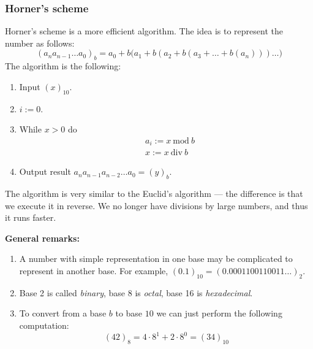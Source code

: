 \subsubsection{Horner's scheme}
Horner's scheme is a more efficient algorithm. The idea is to represent
the number as follows:
\[
    (a_n a_{n - 1} \dots a_{0})_b = 
    a_0 + b\bigl(a_1 + b(a_2 + b(a_3 + \dots + b (a_n))) \dots \bigr)
\]
The algorithm is the following:
\begin{enumerate}
    \item {
        Input $(x)_{10}$.
    }
    \item {
        $i := 0$.
    }
    \item {
        While $x > 0$ do
        \begin{align*}
            &
            a_i := x \ \mathrm{mod}\ b
            \\&
            x := x \ \mathrm{div}\ b
        \end{align*}
    }
    \item {
        Output result $a_n a_{n-1} a_{n-2} \dots a_0 = (y)_b$.
    }
\end{enumerate}
\begin{remark}
    The algorithm is very similar to the Euclid's algorithm ---
    the difference is that we execute it in reverse. 
    We no longer have divisions by large numbers, and thus
    it runs faster.
\end{remark}

\textbf{General remarks:}
\begin{enumerate}
    \item {
        A number with simple representation in one base 
        may be complicated to represent in another base.
        For example,
        $(0.1)_{10} = (0.0001100110011\dots)_2$.
    }
    \item {
        Base 2 is called \textit{binary},
        base 8 is \textit{octal},
        base 16 is \textit{hexadecimal}.
    }
    \item {
        To convert from a base $b$
        to base $10$ we can just perform the following computation:
        \[
            (42)_8 = 4 \cdot 8^1 + 2 \cdot 8^0 = (34)_{10}
        \]
    }
\end{enumerate}
